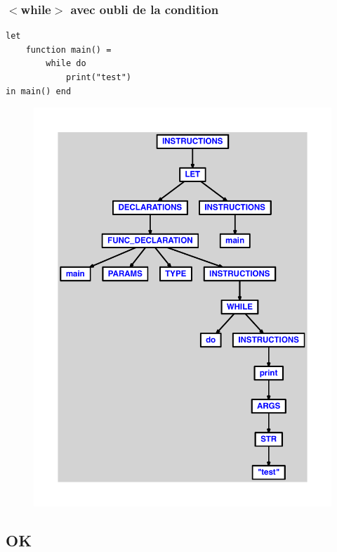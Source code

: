 \documentclass{article}
\begin{document}
\subsubsection{$ < $while$ > $ avec oubli de la condition}
\begin{lstlisting}
let
	function main() =
		while do
			print("test")
in main() end
\end{lstlisting}
\newpage
\begin{figure}[H]
\centering
\includegraphics[max width=\textwidth]{ast/ast_328.pdf}
\end{figure}
\newpage
\subsection{OK}
\end{document}
